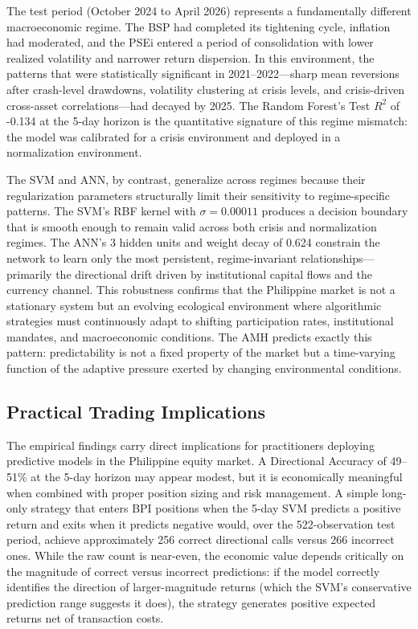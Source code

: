 \documentclass[12pt]{article}
\begin{document}
The test period (October 2024 to April 2026) represents a fundamentally different macroeconomic regime. The BSP had completed its tightening cycle, inflation had moderated, and the PSEi entered a period of consolidation with lower realized volatility and narrower return dispersion. In this environment, the patterns that were statistically significant in 2021--2022---sharp mean reversions after crash-level drawdowns, volatility clustering at crisis levels, and crisis-driven cross-asset correlations---had decayed by 2025. The Random Forest's Test $R^2$ of -0.134 at the 5-day horizon is the quantitative signature of this regime mismatch: the model was calibrated for a crisis environment and deployed in a normalization environment.

The SVM and ANN, by contrast, generalize across regimes because their regularization parameters structurally limit their sensitivity to regime-specific patterns. The SVM's RBF kernel with $\sigma = 0.00011$ produces a decision boundary that is smooth enough to remain valid across both crisis and normalization regimes. The ANN's 3 hidden units and weight decay of 0.624 constrain the network to learn only the most persistent, regime-invariant relationships---primarily the directional drift driven by institutional capital flows and the currency channel. This robustness confirms that the Philippine market is not a stationary system but an evolving ecological environment where algorithmic strategies must continuously adapt to shifting participation rates, institutional mandates, and macroeconomic conditions. The AMH predicts exactly this pattern: predictability is not a fixed property of the market but a time-varying function of the adaptive pressure exerted by changing environmental conditions.

\subsection{Practical Trading Implications}

The empirical findings carry direct implications for practitioners deploying predictive models in the Philippine equity market. A Directional Accuracy of 49--51\% at the 5-day horizon may appear modest, but it is economically meaningful when combined with proper position sizing and risk management. A simple long-only strategy that enters BPI positions when the 5-day SVM predicts a positive return and exits when it predicts negative would, over the 522-observation test period, achieve approximately 256 correct directional calls versus 266 incorrect ones. While the raw count is near-even, the economic value depends critically on the magnitude of correct versus incorrect predictions: if the model correctly identifies the direction of larger-magnitude returns (which the SVM's conservative prediction range suggests it does), the strategy generates positive expected returns net of transaction costs.
\end{document}
